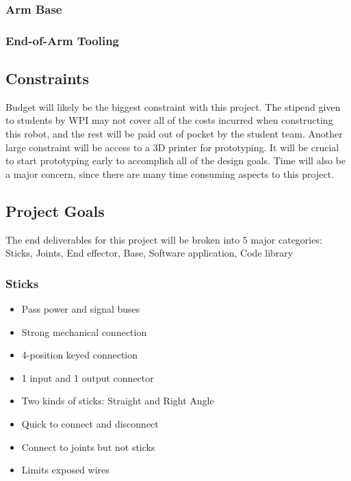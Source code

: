 \subsubsection{Arm Base}

\subsubsection{End-of-Arm Tooling}


\subsection{Constraints}

Budget will likely be the biggest constraint with this project. The stipend given to students by WPI may not cover all of the costs incurred when constructing this robot, and the rest will be paid out of pocket by the student team. Another large constraint will be access to a 3D printer for prototyping. It will be crucial to start prototyping early to accomplish all of the design goals. Time will also be a major concern, since there are many time consuming aspects to this project.

\subsection{Project Goals}
The end deliverables for this project will be broken into 5 major categories: Sticks, Joints, End effector, Base, Software application, Code library

\subsubsection{Sticks}
\begin{itemize}
	\item Pass power and signal buses
	\item Strong mechanical connection
	\item 4-position keyed connection
	\item 1 input and 1 output connector
	\item Two kinds of sticks: Straight and Right Angle
	\item Quick to connect and disconnect
	\item Connect to joints but not sticks
	\item Limits exposed wires
\end{itemize}

